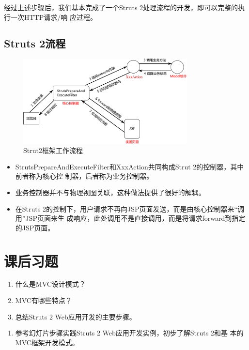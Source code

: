 经过上述步骤后，我们基本完成了一个Struts 2处理流程的开发，即可以完整的执行一次HTTP请求/响
应过程。

\subsection{Struts 2流程}

\begin{figure}[htb]
  \centering
  \includegraphics[width=0.8\textwidth]{images/Java-MVC-and-framework/struts2.pdf}
  \caption{Strut2框架工作流程}
  \label{fig:strut2}
\end{figure}


\begin{itemize}\kai
\item StrutsPrepareAndExecuteFilter和XxxAction共同构成Strut 2的控制器，其中前者称为核心控
  制器，后者称为业务控制器。
\item 业务控制器并不与物理视图关联，这种做法提供了很好的解耦。
\item 在Struts 2的控制下，用户请求不再向JSP页面发送，而是由核心控制器来“调用”JSP页面来生
  成响应，此处调用不是直接调用，而是将请求forward到指定的JSP页面。
\end{itemize}

\section{课后习题}


\begin{enumerate}
\item 什么是MVC设计模式？
\item MVC有哪些特点？
\item 总结Struts 2 Web应用开发的主要步骤。
\end{enumerate}


\begin{enumerate}
\item 参考幻灯片步骤实践Struts 2 Web应用开发实例，初步了解Struts 2和基
  本的MVC框架开发模式。
\end{enumerate}
